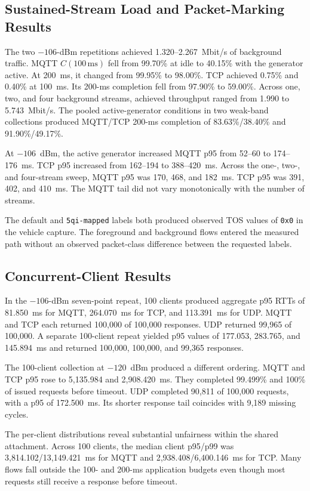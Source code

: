 \subsection{Sustained-Stream Load and Packet-Marking Results}

The two $-106$-dBm repetitions achieved 1.320--2.267~Mbit/s of background
traffic. MQTT $C(100\,\mathrm{ms})$ fell from 99.70\% at idle to 40.15\% with
the generator active. At 200~ms, it changed from 99.95\% to 98.00\%. TCP
achieved 0.75\% and 0.40\% at 100~ms. Its 200-ms completion fell from 97.90\%
to 59.00\%. Across one, two, and four background streams, achieved throughput
ranged from 1.990 to 5.743~Mbit/s. The pooled active-generator conditions in
two weak-band collections produced MQTT/TCP 200-ms completion of
83.63\%/38.40\% and 91.90\%/49.17\%.

At $-106$~dBm, the active generator increased MQTT p95 from 52--60 to
174--176~ms. TCP p95 increased from 162--194 to 388--420~ms. Across the one-,
two-, and four-stream sweep, MQTT p95 was 170, 468, and 182~ms. TCP p95 was
391, 402, and 410~ms. The MQTT tail did not vary monotonically with the number
of streams.

The default and \texttt{5qi-mapped} labels both produced observed TOS values of
\texttt{0x0} in the vehicle capture. The foreground and background flows
entered the measured path without an observed packet-class difference between
the requested labels.

\subsection{Concurrent-Client Results}

In the $-106$-dBm seven-point repeat, 100 clients produced aggregate p95 RTTs
of 81.850~ms for MQTT, 264.070~ms for TCP, and 113.391~ms for UDP. MQTT and TCP
each returned 100,000 of 100,000 responses. UDP returned 99,965 of 100,000. A
separate 100-client repeat yielded p95 values of 177.053, 283.765, and
145.894~ms and returned 100,000, 100,000, and 99,365 responses.

The 100-client collection at $-120$~dBm produced a different ordering. MQTT
and TCP p95 rose to 5,135.984 and 2,908.420~ms. They completed 99.499\% and
100\% of issued requests before timeout. UDP completed 90,811 of
100,000 requests, with a p95 of 172.500~ms. Its shorter response tail coincides
with 9,189 missing cycles.

The per-client distributions reveal substantial unfairness within the shared
attachment. Across 100 clients, the median client p95/p99 was
3,814.102/13,149.421~ms for MQTT and 2,938.408/6,400.146~ms for TCP. Many flows
fall outside the 100- and 200-ms application budgets even though most requests
still receive a response before timeout.

